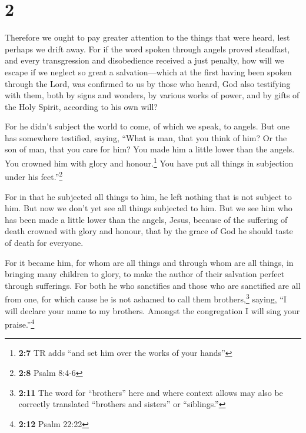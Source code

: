 \hypertarget{section-1}{%
\section{2}\label{section-1}}

 Therefore we ought to pay greater attention to the things
that were heard, lest perhaps we drift away.  For if the
word spoken through angels proved steadfast, and every transgression and
disobedience received a just penalty,  how will we escape
if we neglect so great a salvation---which at the first having been
spoken through the Lord, was confirmed to us by those who heard,
 God also testifying with them, both by signs and wonders,
by various works of power, and by gifts of the Holy Spirit, according to
his own will?

 For he didn't subject the world to come, of which we
speak, to angels.  But one has somewhere testified,
saying, ``What is man, that you think of him? Or the son of man, that
you care for him?  You made him a little lower than the
angels. You crowned him with glory and honour.\footnote{\textbf{2:7} TR
  adds ``and set him over the works of your hands''}  You
have put all things in subjection under his feet.''\footnote{\textbf{2:8}
  Psalm 8:4-6}

For in that he subjected all things to him, he left nothing that is not
subject to him. But now we don't yet see all things subjected to him.
 But we see him who has been made a little lower than the
angels, Jesus, because of the suffering of death crowned with glory and
honour, that by the grace of God he should taste of death for everyone.

 For it became him, for whom are all things and through
whom are all things, in bringing many children to glory, to make the
author of their salvation perfect through sufferings. 
For both he who sanctifies and those who are sanctified are all from
one, for which cause he is not ashamed to call them brothers,\footnote{\textbf{2:11}
  The word for ``brothers'' here and where context allows may also be
  correctly translated ``brothers and sisters'' or ``siblings.''}
 saying, ``I will declare your name to my brothers.
Amongst the congregation I will sing your praise.''\footnote{\textbf{2:12}
  Psalm 22:22}

